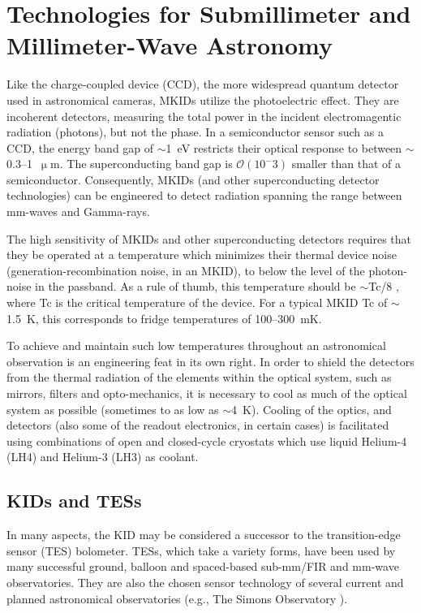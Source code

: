 \section{Technologies for Submillimeter and Millimeter-Wave Astronomy}

Like the charge-coupled device (CCD), the more widespread quantum detector used in astronomical cameras, MKIDs utilize the photoelectric effect. They are incoherent detectors, measuring the total power in the incident electromagentic radiation (photons), but not the phase. In a semiconductor sensor such as a CCD, the energy band gap of $\sim$1~eV restricts their optical response to between $\sim$0.3--1~$\upmu$m. The superconducting band gap is $\mathcal{O}(10^-3)$ smaller than that of a semiconductor. Consequently, MKIDs (and other superconducting detector technologies) can be engineered to detect radiation spanning the range between mm-waves and Gamma-rays.

The high sensitivity of MKIDs and other superconducting detectors requires that they be operated at a temperature which minimizes their thermal device noise (generation-recombination noise, in an MKID), to below the level of the photon-noise in the passband. As a rule of thumb, this temperature should be $\sim$\gls{Tc}/8 \citep{mazin2013arcons}, where \gls{Tc} is the critical temperature of the device. For a typical MKID \gls{Tc} of $\sim$1.5~K, this corresponds to fridge temperatures of 100--300~mK.

To achieve and maintain such low temperatures throughout an astronomical observation is an engineering feat in its own right. In order to shield the detectors from the thermal radiation of the elements within the optical system, such as mirrors, filters and opto-mechanics, it is necessary to cool as much of the optical system as possible (sometimes to as low as $\sim$4~K). Cooling of the optics, and detectors (also some of the readout electronics, in certain cases) is facilitated using combinations of open and closed-cycle cryostats which use liquid Helium-4 (LH4) and Helium-3 (LH3) as coolant.

\subsection{KIDs and TESs}

In many aspects, the KID may be considered a successor to the transition-edge sensor (TES) bolometer. TESs, which take a variety forms, have been used by many successful ground, balloon and spaced-based sub-mm/FIR and mm-wave observatories. They are also the chosen sensor technology of several current and planned astronomical observatories (e.g., The Simons Observatory \citep{ade2019simons}).

